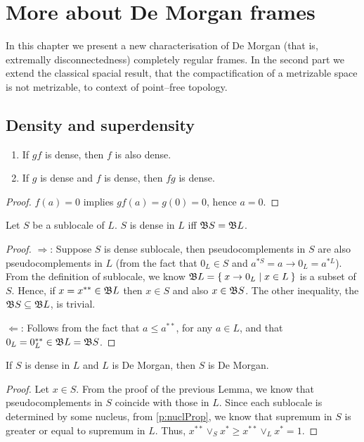 \chapter{More about De Morgan frames}

In this chapter we present a new characterisation of De Morgan (that is, extremally disconnectedness) completely regular frames.
In the second part we extend the classical spacial result, that the compactification of a metrizable space is not metrizable, to context of point--free topology.

\section{Density and superdensity}

\begin{lemma}\label{p:denseProperties}
    \begin{enumerate}
        \item If $gf$ is dense, then $f$ is also dense.
        \item If $g$ is dense and $f$ is dense, then $fg$ is dense.
    \end{enumerate}
\end{lemma}
\begin{proof}
    $f(a) = 0$ implies $gf(a) = g(0) = 0$, hence $a = 0$.
\end{proof}

\begin{lemma}\label{p:denseProperties2}
    Let $S$ be a sublocale of $L$. $S$ is dense in $L$ iff $\mathfrak{B} S = \mathfrak{B} L$.
\end{lemma}
\begin{proof}
    $\Rightarrow$: Suppose $S$ is dense sublocale, then pseudocomplements in $S$ are also pseudocomplements in $L$ (from the fact that $0_L\in S$ and $a^{*S} = a\to 0_L = a^{*L}$).
    From the definition of sublocale, we know $\mathfrak{B} L = \Set{ x\to 0_L | x\in L}$ is a subset of $S$. Hence, if $x = x^{**}\in \mathfrak{B} L$ then $x \in S$ and also $x \in \mathfrak{B} S$. The other inequality, the $\mathfrak{B} S\subseteq \mathfrak{B} L$, is trivial.

    $\Leftarrow$: Follows from the fact that $a\leq a^{**}$, for any $a\in L$, and that $0_L = 0_L^{**} \in \mathfrak{B} L = \mathfrak{B} S$.
\end{proof}

\begin{proposition}\label{p:denseReflectDeMorgan}
    If $S$ is dense in $L$ and $L$ is De Morgan, then $S$ is De Morgan.
\end{proposition}
\begin{proof}
    Let $x\in S$. From the proof of the previous Lemma, we know that pseudocomplements in $S$ coincide with those in $L$. Since each sublocale is determined by some nucleus, from \ref{p:nuclProp}, we know that supremum in $S$ is greater or equal to supremum in $L$. Thus, $x^{**}\vee_S x^* \geq x^{**}\vee_L x^* = 1$.
\end{proof}

